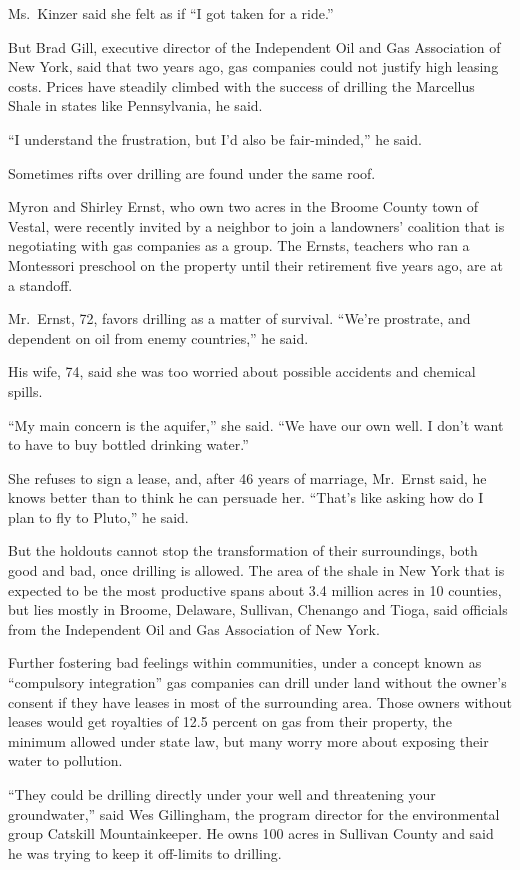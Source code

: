 ﻿\documentclass[12pt]{article}
\begin{document}
Ms.~Kinzer said she felt as if ``I got taken for a ride.''

But Brad Gill, executive director of the Independent Oil and Gas Association of New York, said that
two years ago, gas companies could not justify high leasing costs. Prices have steadily climbed with
the success of drilling the Marcellus Shale in states like Pennsylvania, he said.

``I understand the frustration, but I'd also be fair-minded,'' he said.

Sometimes rifts over drilling are found under the same roof.

Myron and Shirley Ernst, who own two acres in the Broome County town of Vestal, were recently
invited by a neighbor to join a landowners' coalition that is negotiating with gas companies as a
group. The Ernsts, teachers who ran a Montessori preschool on the property until their retirement
five years ago, are at a standoff.

Mr.~Ernst, 72, favors drilling as a matter of survival. ``We're prostrate, and dependent on oil from
enemy countries,'' he said.

His wife, 74, said she was too worried about possible accidents and chemical spills.

``My main concern is the aquifer,'' she said. ``We have our own well. I don't want to have to buy
bottled drinking water.''

She refuses to sign a lease, and, after 46 years of marriage, Mr.~Ernst said, he knows better than
to think he can persuade her. ``That's like asking how do I plan to fly to Pluto,'' he said.

But the holdouts cannot stop the transformation of their surroundings, both good and bad, once
drilling is allowed. The area of the shale in New York that is expected to be the most productive
spans about 3.4 million acres in 10 counties, but lies mostly in Broome, Delaware, Sullivan,
Chenango and Tioga, said officials from the Independent Oil and Gas Association of New York.

Further fostering bad feelings within communities, under a concept known as
``compulsory\cite{compulsory} integration'' gas companies can drill under land without the owner's
consent if they have leases in most of the surrounding area. Those owners without leases would get
royalties of 12.5 percent on gas from their property, the minimum allowed under state law, but many
worry more about exposing their water to pollution.

``They could be drilling directly under your well and threatening your groundwater,'' said Wes
Gillingham, the program director for the environmental group Catskill Mountainkeeper. He owns 100
acres in Sullivan County and said he was trying to keep it off-limits to drilling.
\end{document}

